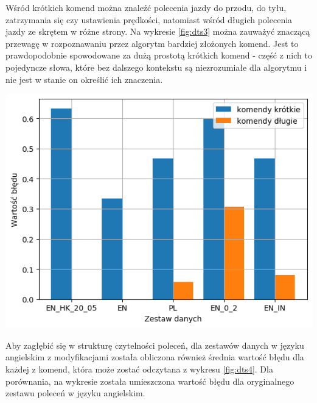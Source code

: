 Wśród krótkich komend można znaleźć polecenia jazdy do przodu, do tyłu, zatrzymania się czy ustawienia prędkości, natomiast wśród długich polecenia jazdy ze skrętem w różne strony. Na wykresie \ref{fig:dts3} można zauważyć znaczącą przewagę w rozpoznawaniu przez algorytm bardziej złożonych komend. Jest to prawdopodobnie spowodowane za dużą prostotą krótkich komend - część z nich to pojedyncze słowa, które bez dalszego kontekstu są niezrozumiałe dla algorytmu i nie jest w stanie on określić ich znaczenia. 

\begin{center}
    \includegraphics[width=0.9\linewidth]{files/output3.png}
    \label{fig:dts3}
\end{center}

Aby zagłębić się w strukturę czytelności poleceń, dla zestawów danych w języku angielskim z modyfikacjami została obliczona również średnia wartość błędu dla każdej z komend, która może zostać odczytana z wykresu \ref{fig:dts4}. Dla porównania, na wykresie została umieszczona wartość błędu dla oryginalnego zestawu poleceń w języku angielskim.

